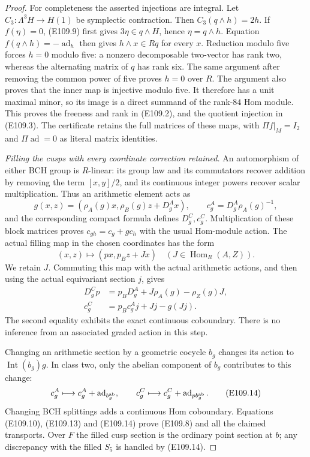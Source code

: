 \begin{proof}
For completeness the asserted injections are integral.  Let
$C_3:\Lambda^3H\to H(1)$ be symplectic contraction.
Then $C_3(q\wedge h)=2h$.  If $f(\eta)=0$, (E109.9) first
gives $3\eta\in q\wedge H$, hence $\eta=q\wedge h$.
Equation $f(q\wedge h)=-\operatorname{ad}_h$ then gives
$h\wedge x\in Rq$ for every $x$.  Reduction modulo five
forces $h=0$ modulo five: a nonzero decomposable two-vector has
rank two, whereas the alternating matrix of $q$ has rank six.
The same argument after removing the common power of five proves
$h=0$ over $R$.  The argument also proves that the inner map is
injective modulo five.  It therefore has a unit maximal minor,
so its image is a direct summand of the rank-$84$ Hom module.
This proves the freeness and rank in (E109.2), and the quotient
injection in (E109.3).  The certificate retains the full matrices
of these maps, with $\Pi f|_M=I_2$ and $\Pi\operatorname{ad}=0$
as literal matrix identities.

\emph{Filling the cusps with every coordinate correction retained.}
An automorphism of either BCH group is $R$-linear: its group
law and its commutators recover addition by removing the term
$[x,y]/2$, and its continuous integer powers recover scalar
multiplication.  Thus an arithmetic element acts as
\[
  g(x,z)=(\rho_A(g)x,\rho_B(g)z+D^A_gx),
  \qquad c^A_g=D^A_g\rho_A(g)^{-1},
 \tag{E109.11}
\]
and the corresponding compact formula defines $D^C_g,c^C_g$.
Multiplication of these block matrices proves
$c_{gh}=c_g+g c_h$ with the usual Hom-module action.  The actual
filling map in the chosen coordinates has the form
\[
       (x,z)\longmapsto(px,p_Bz+Jx)
       \quad(J\in\operatorname{Hom}_R(A,Z)).
 \tag{E109.12}
\]
We retain $J$.  Commuting this map with the actual arithmetic
actions, and then using the actual equivariant section $j$, gives
\[
 \begin{split}
  D^C_gp&=p_BD^A_g+J\rho_A(g)-\rho_Z(g)J,\\
  c^C_g&=p_Bc^A_gj+Jj-g(Jj).
 \end{split}
 \tag{E109.13}
\]
The second equality exhibits the exact continuous coboundary.
There is no inference from an associated graded action in this
step.

Changing an arithmetic section by a geometric cocycle $b_g$
changes its action to $\operatorname{Int}(b_g)g$.  In class two,
only the abelian component of $b_g$ contributes to this change:
\[
           c^A_g\longmapsto c^A_g+\operatorname{ad}_{b_g^{\rm ab}},
 \qquad c^C_g\longmapsto c^C_g+\operatorname{ad}_{p b_g^{\rm ab}}.
 \tag{E109.14}
\]
Changing BCH splittings adds a continuous Hom coboundary.
Equations (E109.10), (E109.13) and (E109.14) prove (E109.8)
and all the claimed transports.  Over $F$ the filled cusp section
is the ordinary point section at $b$; any discrepancy with the
filled $S_5$ is handled by (E109.14).


\end{proof}
